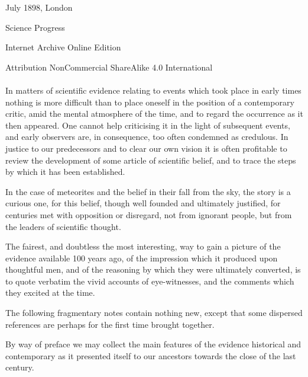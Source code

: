 \documentclass[a4paper, 11pt, oneside]{article}
\begin{document}
\begin{titlepage}
	\vspace*{\fill}%
	
	{\small July 1898, London}%
	
	{\small Science Progress} %

	\vspace{1\baselineskip} %

    Internet Archive Online Edition  %
	
	{\small Attribution NonCommercial ShareAlike 4.0 International } %
\end{titlepage}
\clearpage
\paragraph{}
In matters of scientific evidence relating to events which took place in early times nothing is more difficult than to place oneself in the position of a contemporary critic, amid the mental atmosphere of the time, and to regard the occurrence as it then appeared. One cannot help criticising it in the light of subsequent events, and early observers are, in consequence, too often condemned as credulous. In justice to our predecessors and to clear our own vision it is often profitable to review the development of some article of scientific belief, and to trace the steps by which it has been established. 

In the case of meteorites and the belief in their fall from the sky, the story is a curious one, for this belief, though well founded and ultimately justified, for centuries met with opposition or disregard, not from ignorant people, but from the leaders of scientific thought. 

The fairest, and doubtless the most interesting, way to gain a picture of the evidence available 100 years ago, of the impression which it produced upon thoughtful men, and of the reasoning by which they were ultimately converted, is to quote verbatim the vivid accounts of eye-witnesses, and the comments which they excited at the time. 

The following fragmentary notes contain nothing new, except that some dispersed references are perhaps for the first time brought together. 

By way of preface we may collect the main features of the evidence historical and contemporary as it presented itself to our ancestors towards the close of the last century. 
\end{document}
